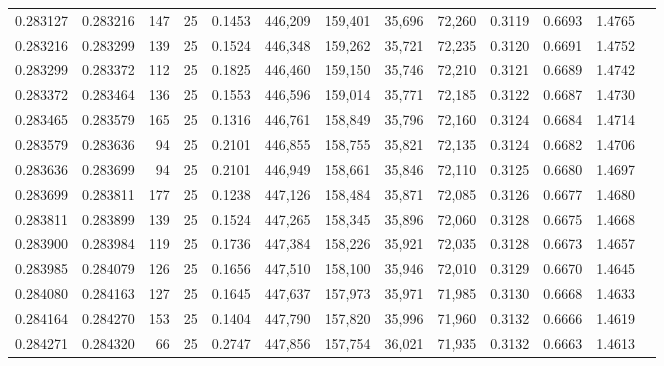 \begin{tabular}{rrrrrrrrrrrrr}
0.283127 & 0.283216 &   147 &  25 &                                     0.1453 & 446,209 & 159,401 &  35,696 &  72,260 & 0.3119 & 0.6693 & 1.4765 \\
0.283216 & 0.283299 &   139 &  25 &                                     0.1524 & 446,348 & 159,262 &  35,721 &  72,235 & 0.3120 & 0.6691 & 1.4752 \\
0.283299 & 0.283372 &   112 &  25 &                                     0.1825 & 446,460 & 159,150 &  35,746 &  72,210 & 0.3121 & 0.6689 & 1.4742 \\
0.283372 & 0.283464 &   136 &  25 &                                     0.1553 & 446,596 & 159,014 &  35,771 &  72,185 & 0.3122 & 0.6687 & 1.4730 \\
0.283465 & 0.283579 &   165 &  25 &                                     0.1316 & 446,761 & 158,849 &  35,796 &  72,160 & 0.3124 & 0.6684 & 1.4714 \\
0.283579 & 0.283636 &    94 &  25 &                                     0.2101 & 446,855 & 158,755 &  35,821 &  72,135 & 0.3124 & 0.6682 & 1.4706 \\
0.283636 & 0.283699 &    94 &  25 &                                     0.2101 & 446,949 & 158,661 &  35,846 &  72,110 & 0.3125 & 0.6680 & 1.4697 \\
0.283699 & 0.283811 &   177 &  25 &                                     0.1238 & 447,126 & 158,484 &  35,871 &  72,085 & 0.3126 & 0.6677 & 1.4680 \\
0.283811 & 0.283899 &   139 &  25 &                                     0.1524 & 447,265 & 158,345 &  35,896 &  72,060 & 0.3128 & 0.6675 & 1.4668 \\
0.283900 & 0.283984 &   119 &  25 &                                     0.1736 & 447,384 & 158,226 &  35,921 &  72,035 & 0.3128 & 0.6673 & 1.4657 \\
0.283985 & 0.284079 &   126 &  25 &                                     0.1656 & 447,510 & 158,100 &  35,946 &  72,010 & 0.3129 & 0.6670 & 1.4645 \\
0.284080 & 0.284163 &   127 &  25 &                                     0.1645 & 447,637 & 157,973 &  35,971 &  71,985 & 0.3130 & 0.6668 & 1.4633 \\
0.284164 & 0.284270 &   153 &  25 &                                     0.1404 & 447,790 & 157,820 &  35,996 &  71,960 & 0.3132 & 0.6666 & 1.4619 \\
0.284271 & 0.284320 &    66 &  25 &                                     0.2747 & 447,856 & 157,754 &  36,021 &  71,935 & 0.3132 & 0.6663 & 1.4613 \\

\end{tabular}
